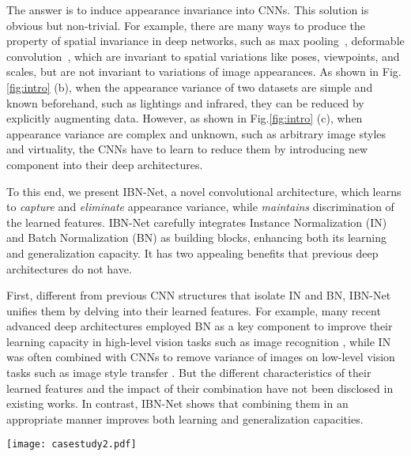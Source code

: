 \documentclass[runningheads]{llncs}
\begin{document}
The answer is to induce appearance invariance into CNNs.
This solution is obvious but non-trivial.
For example, there are many ways to produce the property of spatial invariance in deep networks, such as max pooling~\cite{krizhevsky2012imagenet}, deformable convolution~\cite{dai2017deformable}, which are invariant to spatial variations like poses, viewpoints, and scales, but are not invariant to variations of image appearances.
As shown in Fig.\ref{fig:intro} (b), when the appearance variance of two datasets are simple and known beforehand, such as lightings and infrared, they can be reduced by explicitly augmenting data.
However, as shown in Fig.\ref{fig:intro} (c), when appearance variance are complex and unknown, such as arbitrary image styles and virtuality, the CNNs have to learn to reduce them by introducing new component into their deep architectures.

To this end, we present IBN-Net, a novel convolutional architecture, which learns to \emph{capture} and \emph{eliminate} appearance variance, while \emph{maintains} discrimination of the learned features.
IBN-Net carefully integrates Instance Normalization (IN) and Batch Normalization (BN) as building blocks, enhancing both its learning and generalization capacity.
It has two appealing benefits that previous deep architectures do not have.


First, different from previous CNN structures that isolate IN and BN, IBN-Net unifies them by delving into their learned features.
For example, many recent advanced deep architectures employed BN as a key component to improve their learning capacity in high-level vision tasks such as image recognition \cite{he2016deep,xie2017aggregated,hu2017squeeze,huang2017densely}, while IN was often combined with CNNs to remove variance of images on low-level vision tasks such as image style transfer \cite{ulyanov2017improved,dumoulin2016learned,huang2017arbitrary}.
But the different characteristics of their learned features and the impact of their combination have not been disclosed in existing works.
In contrast, IBN-Net shows that combining them in an appropriate manner improves both learning and generalization capacities.

\begin{figure*}[t]
\centering
\texttt{[image: casestudy2.pdf]}
\caption{\label{casestudy} (a) Feature divergence calculated from image sets with appearance difference (blue) and content difference (orange). We show the results of the 17 features after the residual blocks of ResNet50. The detailed definition of feature divergence is given in Section 4.3. The orange bars are enlarged 10 times for better visualization.}

\end{figure*}
\end{document}
